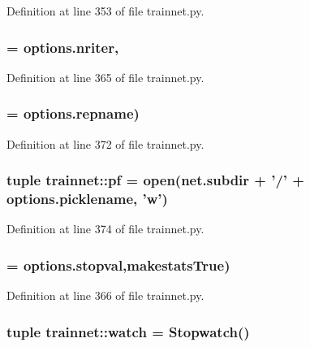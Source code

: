 Definition at line 353 of file trainnet.py.

\hypertarget{namespacetrainnet_a531ebfd51f4947ab5422381d729a8756}{
\subsubsection[{niterations}]{ = options.nriter,}}
\label{namespacetrainnet_a531ebfd51f4947ab5422381d729a8756}


Definition at line 365 of file trainnet.py.

\hypertarget{namespacetrainnet_a3e3b093ef37c5ac35ebdcbfc08bf52e1}{
\subsubsection[{ofname}]{ = options.repname)}}
\label{namespacetrainnet_a3e3b093ef37c5ac35ebdcbfc08bf52e1}


Definition at line 372 of file trainnet.py.

\hypertarget{namespacetrainnet_aacdb2e9555d0d0aa59e25c64e45d48b2}{
\subsubsection[{pf}]{\setlength{\rightskip}{0pt plus 5cm}tuple {\bf trainnet::pf} = open(net.subdir + '/' + options.picklename, 'w')}}
\label{namespacetrainnet_aacdb2e9555d0d0aa59e25c64e45d48b2}


Definition at line 374 of file trainnet.py.

\hypertarget{namespacetrainnet_a8c0014c8c751971aa9ac67420b64d9a5}{
\subsubsection[{stopval}]{ = options.stopval,makestatsTrue)}}
\label{namespacetrainnet_a8c0014c8c751971aa9ac67420b64d9a5}


Definition at line 366 of file trainnet.py.

\hypertarget{namespacetrainnet_a53e6fa3504764aa1a0d61b916af6358a}{
\subsubsection[{watch}]{\setlength{\rightskip}{0pt plus 5cm}tuple {\bf trainnet::watch} = Stopwatch()}}
\label{namespacetrainnet_a53e6fa3504764aa1a0d61b916af6358a}


